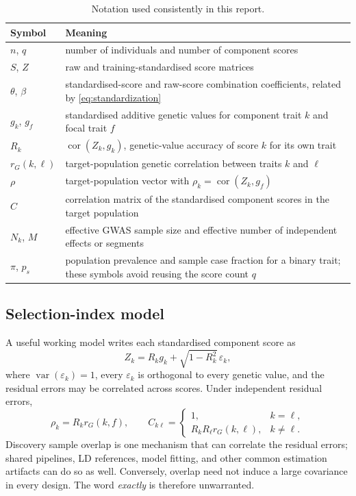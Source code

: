 \documentclass[10pt,a4paper]{article}
\begin{document}
\begin{table}[H]
\centering
\caption{Notation used consistently in this report.}
\label{tab:notation}
\small
\begin{tabularx}{\linewidth}{@{}L{22mm}Y@{}}
\toprule
\textbf{Symbol} & \textbf{Meaning} \\
\midrule
\(n\), \(q\) & number of individuals and number of component scores \\
\(S\), \(Z\) & raw and training-standardised score matrices \\
\(\theta\), \(\beta\) & standardised-score and raw-score combination
coefficients, related by \cref{eq:standardization} \\
\(g_k\), \(g_f\) & standardised additive genetic values for component trait
\(k\) and focal trait \(f\) \\
\(R_k\) & \(\operatorname{cor}(Z_k,g_k)\), genetic-value accuracy of score \(k\)
for its own trait \\
\(r_G(k,\ell)\) & target-population genetic correlation between traits \(k\)
and \(\ell\) \\
\(\rho\) & target-population vector with
\(\rho_k=\operatorname{cor}(Z_k,g_f)\) \\
\(C\) & correlation matrix of the standardised component scores in the target
population \\
\(N_k\), \(M\) & effective GWAS sample size and effective number of independent
effects or segments \\
\(\pi\), \(p_s\) & population prevalence and sample case fraction for a binary
trait; these symbols avoid reusing the score count \(q\) \\
\bottomrule
\end{tabularx}
\end{table}

\subsection{Selection-index model}

A useful working model writes each standardised component score as
\begin{equation}
  Z_k=R_k g_k+\sqrt{1-R_k^2}\,\varepsilon_k,
  \label{eq:score-model}
\end{equation}
where \(\operatorname{var}(\varepsilon_k)=1\), every
\(\varepsilon_k\) is orthogonal to every genetic value, and the residual
errors may be correlated across scores. Under independent residual errors,
\begin{equation}
  \rho_k=R_k r_G(k,f),
  \qquad
  C_{k\ell}=
  \begin{cases}
    1, & k=\ell,\\
    R_kR_\ell r_G(k,\ell), & k\ne\ell .
  \end{cases}
  \label{eq:rho-c}
\end{equation}
Discovery sample overlap is one mechanism that can correlate the residual
errors; shared pipelines, LD references, model fitting, and other common
estimation artifacts can do so as well. Conversely, overlap need not induce a
large covariance in every design. The word \emph{exactly} is therefore
unwarranted.
\end{document}
